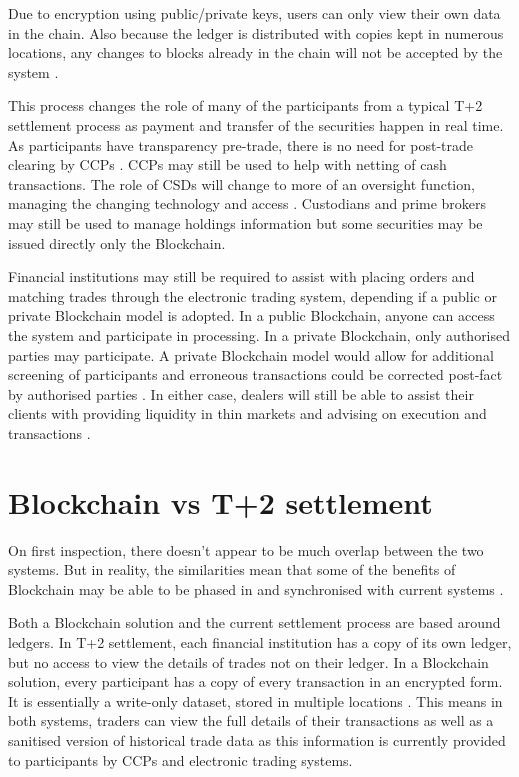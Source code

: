 \documentclass{article}
\begin{document}
Due to encryption using public/private keys, users can only view their own data in the chain. Also because the ledger is distributed with copies kept in numerous locations, any changes to blocks already in the chain will not be accepted by the system \cite{CaytasCU}.

This process changes the role of many of the participants from a typical T+2 settlement process as payment and transfer of the securities happen in real time. As participants have transparency pre-trade, there is no need for post-trade clearing by CCPs \cite{CaytasCU}. CCPs may still be used to help with netting of cash transactions. The role of CSDs will change to more of an oversight function, managing the changing technology and access \cite{WymanEuro}. Custodians and prime brokers may still be used to manage holdings information but some securities may be issued directly only the Blockchain.

Financial institutions may still be required to assist with placing orders and matching trades through the electronic trading system, depending if a public or private Blockchain model is adopted. In a public Blockchain, anyone can access the system and participate in processing. In a private Blockchain, only authorised parties may participate. A private Blockchain model would allow for additional screening of participants and erroneous transactions could be corrected post-fact by authorised parties \cite{gentleIntro}. In either case, dealers will still be able to assist their clients with providing liquidity in thin markets and advising on execution and transactions \cite{WymanEuro}.

\section{Blockchain vs T+2 settlement}

On first inspection, there doesn't appear to be much overlap between the two systems. But in reality, the similarities mean that some of the benefits of Blockchain may be able to be phased in and synchronised with current systems \cite{WymanEuro}.

Both a Blockchain solution and the current settlement process are based around ledgers. In T+2 settlement, each financial institution has a copy of its own ledger, but no access to view the details of trades not on their ledger. In a Blockchain solution, every participant has a copy of every transaction in an encrypted form. It is essentially a write-only dataset, stored in multiple locations \cite{gentleIntro}. This means in both systems, traders can view the full details of their transactions as well as a sanitised version of historical trade data as this information is currently provided to participants by CCPs and electronic trading systems.
\end{document}
